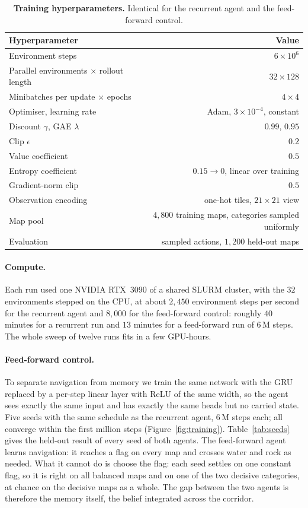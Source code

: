\begin{table}[h]
\centering
\small
\caption{\textbf{Training hyperparameters.} Identical for the recurrent agent
and the feed-forward control.}
\label{tab:hparams}
\begin{tabular}{@{}lr@{}}
\toprule
Hyperparameter & Value \\
\midrule
Environment steps & $6\times10^6$ \\
Parallel environments $\times$ rollout length & $32\times128$ \\
Minibatches per update $\times$ epochs & $4\times4$ \\
Optimiser, learning rate & Adam, $3\times10^{-4}$, constant \\
Discount $\gamma$, GAE $\lambda$ & $0.99$, $0.95$ \\
Clip $\epsilon$ & $0.2$ \\
Value coefficient & $0.5$ \\
Entropy coefficient & $0.15 \to 0$, linear over training \\
Gradient-norm clip & $0.5$ \\
Observation encoding & one-hot tiles, $21\times21$ view \\
Map pool & $4{,}800$ training maps, categories sampled uniformly \\
Evaluation & sampled actions, $1{,}200$ held-out maps \\
\bottomrule
\end{tabular}
\end{table}

\paragraph{Compute.}
Each run used one NVIDIA RTX~3090 of a shared SLURM cluster, with the $32$
environments stepped on the CPU, at about $2{,}450$ environment steps per
second for the recurrent agent and $8{,}000$ for the feed-forward control:
roughly $40$ minutes for a recurrent run and $13$ minutes for a feed-forward
run of $6$\,M steps. The whole sweep of twelve runs fits in a few GPU-hours.

\paragraph{Feed-forward control.}
To separate navigation from memory we train the same network with the GRU
replaced by a per-step linear layer with ReLU of the same width, so the agent
sees exactly the same input and has exactly the same heads but no carried
state. Five seeds with the same schedule as the recurrent agent, $6$\,M steps
each; all converge within the first million steps (Figure~\ref{fig:training}). Table~\ref{tab:seeds} gives the held-out result
of every seed of both agents. The feed-forward agent learns navigation: it
reaches a flag on every map and crosses water and rock as needed. What it
cannot do is choose the flag: each seed settles on one constant flag, so it is
right on all balanced maps and on one of the two decisive categories, at
chance on the decisive maps as a whole. The gap between the two agents is
therefore the memory itself, the belief integrated across the corridor.

